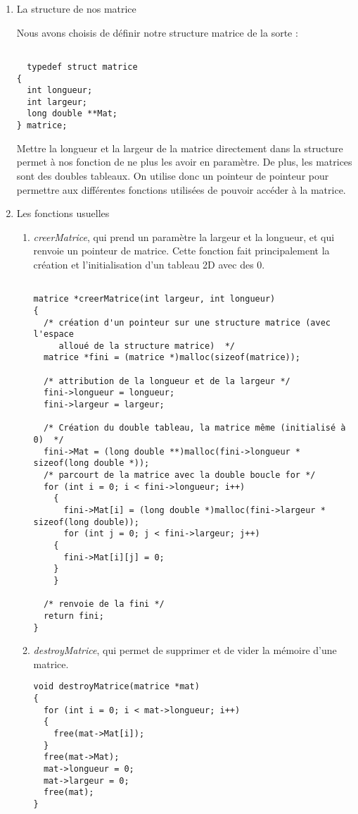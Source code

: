 \documentclass[letter]{article}
\begin{document}
\begin{enumerate}
\item La structure de nos matrice
\label{sec:orgab84745}

Nous avons choisis de définir notre structure matrice de la sorte :

\begin{verbatim}

  typedef struct matrice
{
  int longueur;
  int largeur;
  long double **Mat;
} matrice;

\end{verbatim}

Mettre la longueur et la largeur de la matrice directement dans la structure permet à nos fonction de ne plus les avoir en paramètre. De plus, les matrices sont des doubles tableaux. On utilise donc un pointeur de pointeur pour permettre aux différentes fonctions utilisées de pouvoir accéder à la matrice.


\item Les fonctions usuelles
\label{sec:org39d919e}


\begin{enumerate}
\item \emph{creerMatrice}, qui prend un paramètre la largeur et la longueur, et qui renvoie un pointeur de matrice. Cette fonction fait principalement la création et l'initialisation d'un tableau 2D avec des 0.
\begin{verbatim}

matrice *creerMatrice(int largeur, int longueur)
{
  /* création d'un pointeur sur une structure matrice (avec l'espace
     alloué de la structure matrice)  */
  matrice *fini = (matrice *)malloc(sizeof(matrice));

  /* attribution de la longueur et de la largeur */
  fini->longueur = longueur;
  fini->largeur = largeur;

  /* Création du double tableau, la matrice même (initialisé à 0)  */
  fini->Mat = (long double **)malloc(fini->longueur * sizeof(long double *));
  /* parcourt de la matrice avec la double boucle for */
  for (int i = 0; i < fini->longueur; i++)
    {
      fini->Mat[i] = (long double *)malloc(fini->largeur * sizeof(long double));
      for (int j = 0; j < fini->largeur; j++)
	{
	  fini->Mat[i][j] = 0;
	}
    }

  /* renvoie de la fini */
  return fini;
}     

\end{verbatim}

\item \emph{destroyMatrice}, qui permet de supprimer et de vider la mémoire d'une matrice.
\begin{verbatim}
void destroyMatrice(matrice *mat)
{
  for (int i = 0; i < mat->longueur; i++)
  {
    free(mat->Mat[i]);
  }
  free(mat->Mat);
  mat->longueur = 0;
  mat->largeur = 0;
  free(mat);
}
\end{verbatim}


\end{enumerate}
\end{enumerate}
\end{document}
